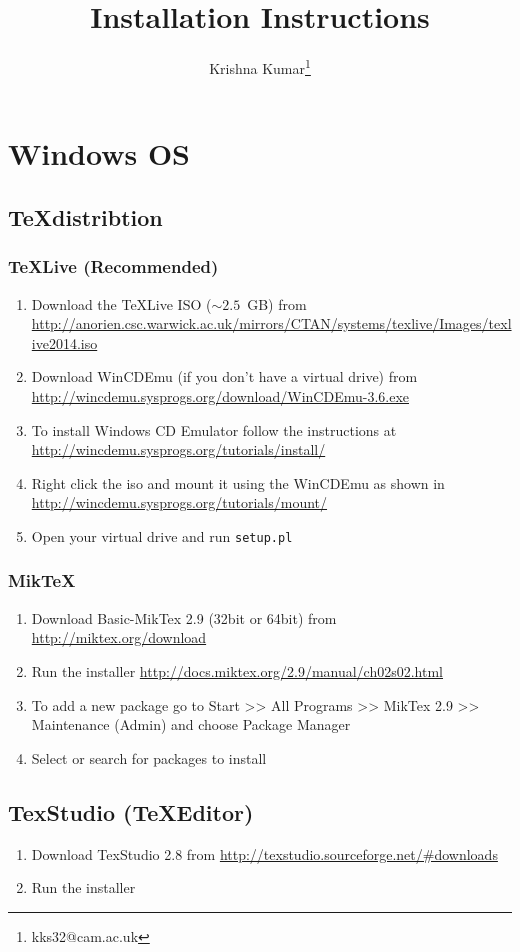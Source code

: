 \documentclass[times,twoside,11pt]{article}
\title{\LaTeXe  Installation Instructions}
\author{Krishna Kumar\thanks{kks32@cam.ac.uk}}
\date{}
\begin{document}
\maketitle

\section*{Windows OS}
\subsection*{\TeX distribtion}
\subsubsection*{\TeX Live (Recommended)}
\begin{enumerate}
\item	Download the \TeX Live ISO ($\sim 2.5$~GB) from 
\url{http://anorien.csc.warwick.ac.uk/mirrors/CTAN/systems/texlive/Images/texlive2014.iso}
\item	Download WinCDEmu (if you don't have a virtual drive) from 
\url{http://wincdemu.sysprogs.org/download/WinCDEmu-3.6.exe}
\item	To install Windows CD Emulator follow the instructions at 
\url{http://wincdemu.sysprogs.org/tutorials/install/}
\item	Right click the iso and mount it using the WinCDEmu as shown in 
\url{http://wincdemu.sysprogs.org/tutorials/mount/}
\item	Open your virtual drive and run \verb|setup.pl|
\end{enumerate}

\subsubsection*{Mik\TeX}
\begin{enumerate}
\item	Download Basic-MikTex 2.9 (32bit or 64bit) from 
\url{http://miktex.org/download}
\item	Run the installer 
\url{http://docs.miktex.org/2.9/manual/ch02s02.html}
\item	To add a new package go to Start >> All Programs >> MikTex 2.9 >> 
Maintenance (Admin) and choose Package Manager
\item	Select or search for packages to install
\end{enumerate}


\subsection*{TexStudio (\TeX Editor)}
\begin{enumerate}
\item	Download TexStudio 2.8 from 
\url{http://texstudio.sourceforge.net/\#downloads} 
\item	Run the installer
\end{enumerate}
\end{document}
